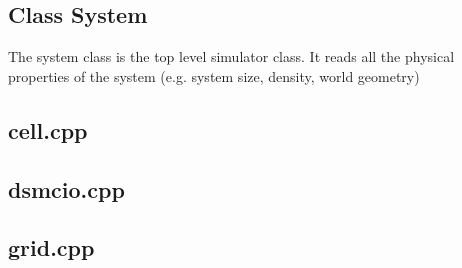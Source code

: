 \subsection{Class System}
The system class is the top level simulator class. It reads all the physical properties of the system (e.g. system size, density, world geometry)

\subsection{cell.cpp}
\subsection{dsmcio.cpp}
\subsection{grid.cpp}
